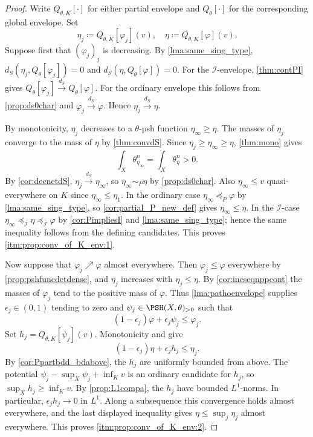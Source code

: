 \begin{proof}
Write $Q_{\theta,K}[\cdot]$ for either partial envelope and $Q_\theta[\cdot]$ for the corresponding global envelope. Set
\[
    \eta_j\coloneqq Q_{\theta,K}[\varphi_j](v),\quad
    \eta\coloneqq Q_{\theta,K}[\varphi](v).
\]
Suppose first that $(\varphi_j)_j$ is decreasing. By \cref{lma:same_sing_type}, $d_S(\eta_j,Q_\theta[\varphi_j])=0$ and $d_S(\eta,Q_\theta[\varphi])=0$. For the $\mathcal I$-envelope, \cref{thm:contPI} gives $Q_\theta[\varphi_j]\xrightarrow{d_S}Q_\theta[\varphi]$. For the ordinary envelope this follows from \cref{prop:ds0char} and $\varphi_j\xrightarrow{d_S}\varphi$. Hence $\eta_j\xrightarrow{d_S}\eta$.

By monotonicity, $\eta_j$ decreases to a $\theta$-psh function $\eta_\infty\geq\eta$. The masses of $\eta_j$ converge to the mass of $\eta$ by \cref{thm:convdS}. Since $\eta_j\geq\eta_\infty\geq\eta$, \cref{thm:mono} gives
\[
    \int_X\theta_{\eta_\infty}^n=\int_X\theta_\eta^n>0.
\]
By \cref{cor:decnetdS}, $\eta_j\xrightarrow{d_S}\eta_\infty$, so $\eta_\infty\sim_P\eta$ by \cref{prop:ds0char}. Also $\eta_\infty\leq v$ quasi-everywhere on $K$ since $\eta_\infty\leq\eta_1$. In the ordinary case $\eta_\infty\preceq_P\varphi$ by \cref{lma:same_sing_type}, so \cref{cor:partial_P_new_def} gives $\eta_\infty\leq\eta$. In the $\mathcal I$-case $\eta_\infty\preceq_{\mathcal I}\eta\preceq_{\mathcal I}\varphi$ by \cref{cor:PimpliesI} and \cref{lma:same_sing_type}; hence the same inequality follows from the defining candidates. This proves \ref{itm:prop:conv_of_K_env:1}.

Now suppose that $\varphi_j\nearrow\varphi$ almost everywhere. Then $\varphi_j\leq\varphi$ everywhere by \cref{prop:pshfuncdetdense}, and $\eta_j$ increases with $\eta_j\leq\eta$. By \cref{cor:incseqnppcont} the masses of $\varphi_j$ tend to the positive mass of $\varphi$. Thus \cref{lma:pathoenvelope} supplies $\epsilon_j\in(0,1)$ tending to zero and $\psi_j\in\PSH(X,\theta)_{>0}$ such that
    \[
        (1-\epsilon_j)\varphi+\epsilon_j\psi_j\leq\varphi_j.
    \]
Set $h_j=Q_{\theta,K}[\psi_j](v)$. Monotonicity and  give
    \[
        (1-\epsilon_j)\eta+\epsilon_j h_j\leq\eta_j.
    \]
By \cref{cor:Ppartbdd_bdabove}, the $h_j$ are uniformly bounded from above. The potential $\psi_j-\sup_X\psi_j+\inf_K v$ is an ordinary candidate for $h_j$, so $\sup_X h_j\geq\inf_K v$. By \cref{prop:L1compa}, the $h_j$ have bounded $L^1$-norms. In particular, $\epsilon_j h_j\to 0$ in $L^1$. Along a subsequence this convergence holds almost everywhere, and the last displayed inequality gives $\eta\leq\sup_j\eta_j$ almost everywhere. This proves \ref{itm:prop:conv_of_K_env:2}.
\end{proof}







